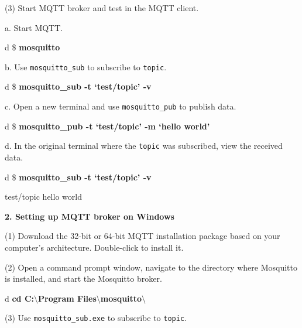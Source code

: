 \documentclass[a4paper,12pt]{book}
\begin{document}
(3) Start MQTT broker and test in the MQTT client.

a. Start MQTT.

\begin{codebloc}
\begin{tabular}{d}
\$ \textbf{mosquitto}
\end{tabular}
\end{codebloc}

b. Use \verb|mosquitto_sub| to subscribe to \verb|topic|.

\begin{codebloc}
\begin{tabular}{d}
\$ \textbf{mosquitto\_sub -t ‘test/topic’ -v}
\end{tabular}
\end{codebloc}

c. Open a new terminal and use \verb|mosquitto_pub| to publish data.

\begin{codebloc}
\begin{tabular}{d}
\$ \textbf{mosquitto\_pub -t ‘test/topic’ -m ‘hello world’}
\end{tabular}
\end{codebloc}

d. In the original terminal where the \verb|topic| was subscribed, view the received data.

\begin{codebloc}
\begin{tabular}{d}
\$ \textbf{mosquitto\_sub -t ‘test/topic’ -v}

test/topic hello world
\end{tabular}
\end{codebloc}

\textbf{2. Setting up MQTT broker on Windows}

(1) Download the 32-bit or 64-bit MQTT installation package based on your computer’s architecture. Double-click to install it.

(2) Open a command prompt window, navigate to the directory where Mosquitto is installed, and start the Mosquitto broker.

\begin{codebloc}
\begin{tabular}{d}
\textbf{cd C:$\setminus$Program Files$\setminus$mosquitto$\setminus$}
\end{tabular}
\end{codebloc}

(3) Use \verb|mosquitto_sub.exe| to subscribe to \verb|topic|.
\end{document}
